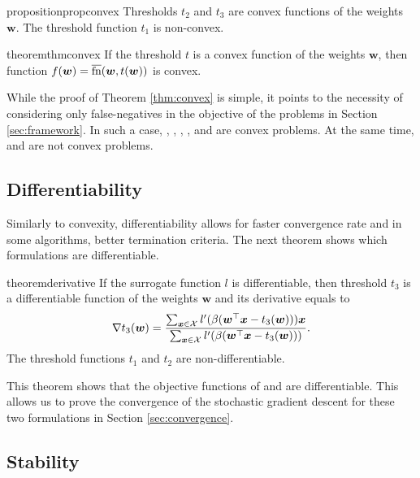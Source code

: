 \begin{restatable}{proposition}{propconvex}\label{prop:convex}
  Thresholds $t_2$ and $t_3$ are convex functions of the weights $\bm{w}$. The threshold function $t_1$ is non-convex.
\end{restatable}

\begin{restatable}{theorem}{thmconvex}\label{thm:convex}
  If the threshold $t$ is a convex function of the weights $\bm{w}$, then function $f(\bm{w}) = \overline{\textnormal{fn}}(\bm{w}, t(\bm{w}))$ is convex.
\end{restatable}

While the proof of Theorem \ref{thm:convex} is simple, it points to the necessity of considering only false-negatives in the objective of the problems in Section \ref{sec:framework}. In such a case, \TopPush, \TopPushK, \TopMeanK, \tauFPL, \PatMat and \PatMatNP are convex problems. At the same time, \Grill and \GrillNP are not convex problems.

\subsection{Differentiability}

Similarly to convexity, differentiability allows for faster convergence rate and in some algorithms, better termination criteria. The next theorem shows which formulations are differentiable.

\begin{restatable}{theorem}{derivative}\label{thm:derivative}
  If the surrogate function $l$ is differentiable, then threshold $t_3$ is a differentiable function of the weights $\bm{w}$ and its derivative equals to
  \begin{equation*}
    \nabla t_3(\bm{w}) = \frac{\sum_{\bm{x} \in \mathcal{X}} l'(\beta(\bm{w}^\top \bm{x} - t_3(\bm{w})))\bm{x}}{\sum_{\bm{x} \in \mathcal{X}}l'(\beta(\bm{w}^\top \bm{x} - t_3(\bm{w})))}.
  \end{equation*}
  The threshold functions $t_1$ and $t_2$ are non-differentiable.
\end{restatable}

\noindent This theorem shows that the objective functions of \PatMat and \PatMatNP are differentiable. This allows us to prove the convergence of the stochastic gradient descent for these two formulations in Section \ref{sec:convergence}.

\subsection{Stability}\label{sec:stability}

